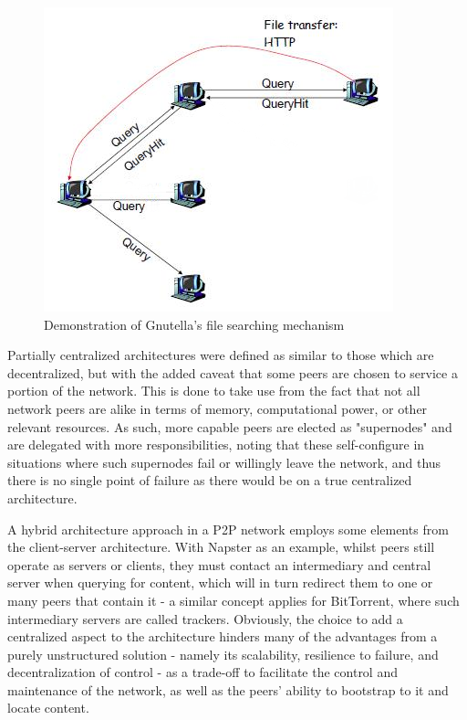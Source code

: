 
\begin{figure}[!h]
\centering
\includegraphics[scale=1.2]{img/gnutella-flood.png}
\caption{Demonstration of Gnutella's file searching mechanism \cite{p2p-survey-1}}
\label{fig:gnutella-flood}
\end{figure}

    Partially centralized architectures were defined as similar to those which are decentralized, but with the added caveat that some peers are chosen to service a portion of the network.
    This is done to take use from the fact that not all network peers are alike in terms of memory, computational power, or other relevant resources.
    As such, more capable peers are elected as "supernodes" and are delegated with more responsibilities, noting that these self-configure in situations where such supernodes fail or willingly leave the network, and thus there is no single point of failure as there would be on a true centralized architecture.

    A hybrid architecture approach in a P2P network employs some elements from the client-server architecture.
    With Napster as an example, whilst peers still operate as servers or clients, they must contact an intermediary and central server when querying for content, which will in turn redirect them to one or many peers that contain it - a similar concept applies for BitTorrent, where such intermediary servers are called trackers.
    Obviously, the choice to add a centralized aspect to the architecture hinders many of the advantages from a purely unstructured solution - namely its scalability, resilience to failure, and decentralization of control - as a trade-off to facilitate the control and maintenance of the network, as well as the peers' ability to bootstrap to it and locate content.


